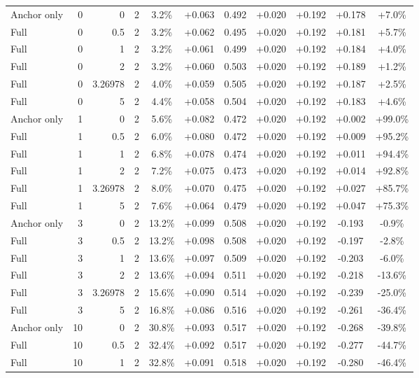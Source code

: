 \begin{table}[htbp]
\begin{tabular}{lrrrccccccc}
Anchor only & 0 & 0 & 2 & 3.2\% & +0.063 & 0.492 & +0.020 & +0.192 & +0.178 & +7.0\% \\
Full & 0 & 0.5 & 2 & 3.2\% & +0.062 & 0.495 & +0.020 & +0.192 & +0.181 & +5.7\% \\
Full & 0 & 1 & 2 & 3.2\% & +0.061 & 0.499 & +0.020 & +0.192 & +0.184 & +4.0\% \\
Full & 0 & 2 & 2 & 3.2\% & +0.060 & 0.503 & +0.020 & +0.192 & +0.189 & +1.2\% \\
Full & 0 & 3.26978 & 2 & 4.0\% & +0.059 & 0.505 & +0.020 & +0.192 & +0.187 & +2.5\% \\
Full & 0 & 5 & 2 & 4.4\% & +0.058 & 0.504 & +0.020 & +0.192 & +0.183 & +4.6\% \\
Anchor only & 1 & 0 & 2 & 5.6\% & +0.082 & 0.472 & +0.020 & +0.192 & +0.002 & +99.0\% \\
Full & 1 & 0.5 & 2 & 6.0\% & +0.080 & 0.472 & +0.020 & +0.192 & +0.009 & +95.2\% \\
Full & 1 & 1 & 2 & 6.8\% & +0.078 & 0.474 & +0.020 & +0.192 & +0.011 & +94.4\% \\
Full & 1 & 2 & 2 & 7.2\% & +0.075 & 0.473 & +0.020 & +0.192 & +0.014 & +92.8\% \\
Full & 1 & 3.26978 & 2 & 8.0\% & +0.070 & 0.475 & +0.020 & +0.192 & +0.027 & +85.7\% \\
Full & 1 & 5 & 2 & 7.6\% & +0.064 & 0.479 & +0.020 & +0.192 & +0.047 & +75.3\% \\
Anchor only & 3 & 0 & 2 & 13.2\% & +0.099 & 0.508 & +0.020 & +0.192 & -0.193 & -0.9\% \\
Full & 3 & 0.5 & 2 & 13.2\% & +0.098 & 0.508 & +0.020 & +0.192 & -0.197 & -2.8\% \\
Full & 3 & 1 & 2 & 13.6\% & +0.097 & 0.509 & +0.020 & +0.192 & -0.203 & -6.0\% \\
Full & 3 & 2 & 2 & 13.6\% & +0.094 & 0.511 & +0.020 & +0.192 & -0.218 & -13.6\% \\
Full & 3 & 3.26978 & 2 & 15.6\% & +0.090 & 0.514 & +0.020 & +0.192 & -0.239 & -25.0\% \\
Full & 3 & 5 & 2 & 16.8\% & +0.086 & 0.516 & +0.020 & +0.192 & -0.261 & -36.4\% \\
Anchor only & 10 & 0 & 2 & 30.8\% & +0.093 & 0.517 & +0.020 & +0.192 & -0.268 & -39.8\% \\
Full & 10 & 0.5 & 2 & 32.4\% & +0.092 & 0.517 & +0.020 & +0.192 & -0.277 & -44.7\% \\
Full & 10 & 1 & 2 & 32.8\% & +0.091 & 0.518 & +0.020 & +0.192 & -0.280 & -46.4\% \\

\end{tabular}
\end{table}
